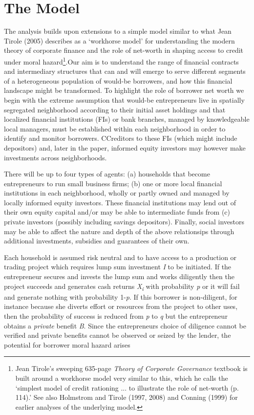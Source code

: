 \documentclass{article}
\begin{document}
\section{The Model}\label{the-model}

The analysis builds upon extensions to a simple model similar to what
Jean Tirole (2005) describes as a `workhorse model' for understanding
the modern theory of corporate finance and the role of net-worth in
shaping access to credit under moral hazard\footnote{Jean Tirole's
  sweeping 635-page \emph{Theory of Corporate Governance} textbook is
  built around a workhorse model very similar to this, which he calls
  the `simplest model of credit rationing ... to illustrate the role of
  net-worth (p. 114).' See also Holmstrom and Tirole (1997, 2008) and
  Conning (1999) for earlier analyses of the underlying model.}.Our aim
is to understand the range of financial contracts and intermediary
structures that can and will emerge to serve different segments of a
heterogeneous population of would-be borrowers, and how this financial
landscape might be transformed. To highlight the role of borrower net
worth we begin with the extreme assumption that would-be entrepreneurs
live in spatially segregated neighborhood according to their initial
asset holdings and that localized financial institutions (FIs) or bank
branches, managed by knowledgeable local managers, must be established
within each neighborhood in order to identify and monitor borrowers.
CCreditors to these FIs (which might include depositors) and, later in
the paper, informed equity investors may however make investments across
neighborhoods.

There will be up to four types of agents: (a) households that become
entrepreneurs to run small business firms; (b) one or more local
financial institutions in each neighborhood, wholly or partly owned and
managed by locally informed equity investors. These financial
institutions may lend out of their own equity capital and/or may be able
to intermediate funds from (c) private investors (possibly including
savings depositors). Finally, social investors may be able to affect the
nature and depth of the above relationsips through additional
investments, subsidies and guarantees of their own.

Each household is assumed risk neutral and to have access to a
production or trading project which requires lump sum investment
\emph{I} to be initiated. If the entrepreneur secures and invests the
lump sum and works diligently then the project succeeds and generates
cash returns \emph{X\textsubscript{i}} with probability \emph{p} or it
will fail and generate nothing with probability 1-\emph{p}. If this
borrower is non-diligent, for instance because she diverts effort or
resources from the project to other uses, then the probability of
success is reduced from \emph{p} to \emph{q} but the entrepreneur
obtains a \emph{private} benefit \emph{B}. Since the entrepreneurs
choice of diligence cannot be verified and private benefits cannot be
observed or seized by the lender, the potential for borrower moral
hazard arises
\end{document}
